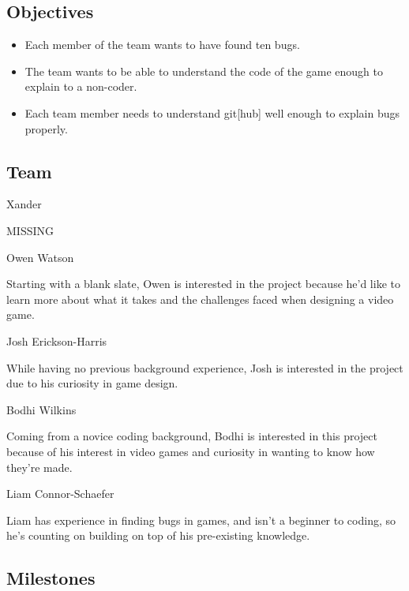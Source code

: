\documentclass[11pt]{article}
\begin{document}
\subsection{{\color{blue}Objectives}}

\begin{itemize}
	\item Each member of the team wants to have found ten bugs.
	\item The team wants to be able to understand the code of the game enough to explain to a non-coder.
	\item Each team member needs to understand git[hub] well enough to explain bugs properly.
\end{itemize}

\subsection{{\color{blue}Team}}

{\large {\color{orange}Xander}}

{\large {\color{red}MISSING}}

{\large {\color{orange}Owen Watson}}

Starting with a blank slate, Owen is interested in the project because he'd like to learn more about what it takes and the challenges faced when designing a video game.


{\large {\color{orange}Josh Erickson-Harris}}

While having no previous background experience, Josh is interested in the project due to his curiosity in game design.

{\large {\color{orange}Bodhi Wilkins}}

Coming from a novice coding background, Bodhi is interested in this project because of his interest in video games and curiosity in wanting to know how they're made.

{\large {\color{orange}Liam Connor-Schaefer}}

Liam has experience in finding bugs in games, and isn't a beginner to coding, so he's counting on building on top of his pre-existing knowledge.

\subsection{{\color{blue}Milestones}}
\end{document}
